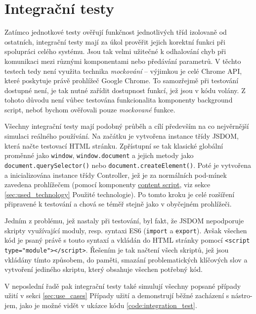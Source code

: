 \documentclass[thesis=B,czech]{FITthesis}[2012/06/26]
\begin{document}

\section{Integrační testy}
Zatímco jednotkové testy ověřují funkčnost jednotlivých tříd izolovaně od ostatních, integrační testy mají za úkol prověřit jejich korektní funkci při spolupráci celého systému. Jsou tak velmi užitečné k odhalování chyb při komunikaci mezi různými komponentami nebo předávání parametrů. V těchto testech tedy není využita technika \textit{mockování} -- výjimkou je celé Chrome API, které poskytuje právě prohlížeč Google Chrome. To samozřejmě při testování dostupné není, je tak nutné zařídit dostupnost funkcí, jež jsou v kódu volány. Z tohoto důvodu není vůbec testována funkcionalita komponenty background script, neboť bychom ověřovali pouze \textit{mockované} funkce.

Všechny integrační testy mají podobný průběh a cílí především na co nejvěrnější simulaci reálného používání. Na začátku je vytvořena instance třídy JSDOM, která načte testovací HTML stránku. Zpřístupní se tak klasické globální proměnné jako \verb|window|, \verb|window.document| a jejich metody jako \verb|document.querySelector()| nebo \verb|document.createElement()|. Poté je vytvořena a inicializována instance třídy Controller, jež je za normálních pod-mínek zavedena prohlížečem (pomocí komponenty \hyperref[def:content_script]{content script}, viz sekce \ref{sec:used_technology} Použité technologie). Po tomto kroku je celé rozšíření připravené k testování a chová se téměř stejně jako v obyčejném prohlížeči.

Jedním z problému, jež nastaly při testování, byl fakt, že JSDOM nepodporuje skripty využívající moduly, resp. syntaxi ES6 (\verb|import| a \verb|export|). Avšak všechen kód je psaný právě s touto syntaxí a vkládán do HTML stránky pomocí \verb|<script type="module"></script>|. Řešením je tak načtení všech skriptů, jež jsou vkládány tímto způsobem, do paměti, smazání problematických klíčových slov a vytvoření jediného skriptu, který obsahuje všechen potřebný kód.

V neposlední řadě pak integrační testy také simulují všechny popsané případy užití v sekci \ref{sec:use_cases} Případy užití a demonstrují běžné zacházení s nástro-jem, jako je možné vidět v ukázce kódu \ref{code:integration_test}.
\end{document}
